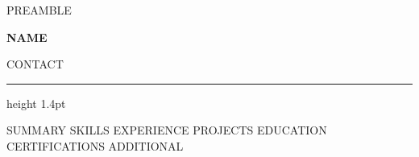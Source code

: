 %
%
{{PREAMBLE}}


\renewcommand{\cvsectionfont}[1]{%
  {\large\bfseries\color{cvaccent} #1}\hspace{0.6em}%
  \leaders\hrule height 1.1pt\hfill\kern0pt
}
\renewcommand{\cvsectionrule}{}

\renewcommand{\cvheader}[2]{%
  {\fontsize{24}{27}\selectfont\bfseries\color{cvaccent} #1}\par\vspace{4pt}%
  {\small\color{cvmuted} #2}\par\vspace{5pt}%
  {\color{cvaccent}\hrule height 1.4pt}%
  \vspace{2pt}%
}



\cvheader{ {{NAME}} }{ {{CONTACT}} }

{{SUMMARY}}
{{SKILLS}}
{{EXPERIENCE}}
{{PROJECTS}}
{{EDUCATION}}
{{CERTIFICATIONS}}
{{ADDITIONAL}}


